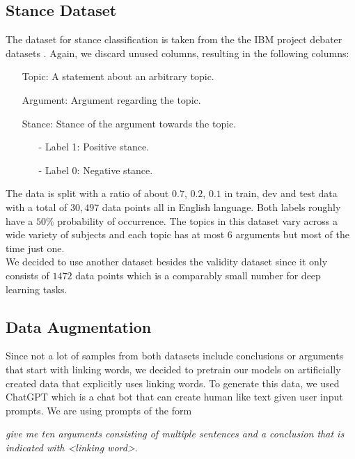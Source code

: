 \subsection{Stance Dataset}

The dataset for stance classification is taken from the the IBM project debater datasets \cite{stancedata, ibm}. Again, we discard unused columns, resulting in the following columns:
\begin{enumerate}
	\item[\textbullet] Topic: A statement about an arbitrary topic.
	\item[\textbullet] Argument: Argument regarding the topic.
	\item[\textbullet] Stance: Stance of the argument towards the topic.
	\begin{enumerate}
		\item[-] Label 1: Positive stance.
		\item[-] Label 0: Negative stance.
	\end{enumerate}
\end{enumerate}
The data is split with a ratio of about $0.7$, $0.2$, $0.1$ in train, dev and test data with a total of $30,497$ data points all in English language. Both labels roughly have a $50\%$ probability of occurrence. The topics in this dataset vary across a wide variety of subjects and each topic has at most $6$ arguments \cite{stancedata} but most of the time just one. \\
We decided to use another dataset besides the validity dataset since it only consists of $1472$ data points which is a comparably small number for deep learning tasks.

\subsection{Data Augmentation} \label{sec:chatgpt}

Since not a lot of samples from both datasets include conclusions or arguments that start with linking words, we decided to pretrain our models on artificially created data that explicitly uses linking words. To generate this data, we used ChatGPT \cite{chatgpt} which is a chat bot that can create human like text given user input prompts. We are using prompts of the form
\begin{center}
	\textit{give me ten arguments consisting of multiple sentences and a conclusion that is indicated with <linking word>}.
\end{center}

